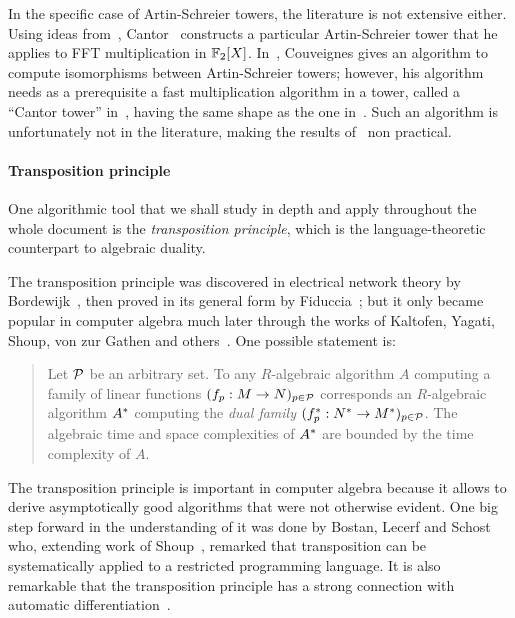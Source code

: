In the specific case of Artin-Schreier towers, the literature is not
extensive either.  Using ideas from~\cite{Conway:ONAG2000},
Cantor~\cite{cantor89} constructs a particular Artin-Schreier tower
that he applies to FFT multiplication in $\mathbb{F}_2[X]$.
In~\cite{couveignes00}, Couveignes gives an algorithm to compute
isomorphisms between Artin-Schreier towers; however, his algorithm
needs as a prerequisite a fast multiplication algorithm in a tower,
called a ``Cantor tower'' in~\cite{couveignes00}, having the same
shape as the one in~\cite{cantor89}. Such an algorithm is
unfortunately not in the literature, making the results
of~\cite{couveignes00} non practical.


\paragraph*{Transposition principle}
One algorithmic tool that we shall study in depth and apply throughout
the whole document is the \emph{transposition principle}, which is the
language-theoretic counterpart to algebraic duality.

The transposition principle was discovered in electrical network
theory by Bordewijk~\cite{bordewijk57}, then proved in its general
form by Fiduccia~\cite{fiduccia:phd}; but it only became popular in
computer algebra much later through the works of Kaltofen, Yagati,
Shoup, von zur Gathen and
others~\cite{kaltofen+lakshman89,vzgathen+shoup92,shoup94,shoup95,shoup99,hanrot+quercia+zimmermann}. One
possible statement is:
\begin{quote}
  Let $\mathcal{P}$ be an arbitrary set. To any $R$-algebraic algorithm
  $A$ computing a family of linear functions $(f_p:M\rightarrow
  N)_{p\in\mathcal{P}}$ corresponds an $R$-algebraic algorithm $A^\ast$
  computing the \emph{dual family}
  $(f^\ast_p:N^\ast\rightarrow M^\ast)_{p\in\mathcal{P}}$. The algebraic time
  and space complexities of $A^\ast$ are bounded by the time
  complexity of $A$.
\end{quote}

The transposition principle is important in computer algebra because
it allows to derive asymptotically good algorithms that were not
otherwise evident. One big step forward in the understanding of it was
done by Bostan, Lecerf and Schost~\cite{bostan+lecerf+schost:tellegen}
who, extending work of Shoup~\cite{shoup95}, remarked that
transposition can be systematically applied to a restricted
programming language. It is also remarkable that the transposition
principle has a strong connection with automatic
differentiation~\cite{baur+strassen83,kaltofen+lakshman89,Ka2K,gashkov+gashkov05,sergeev08}.


